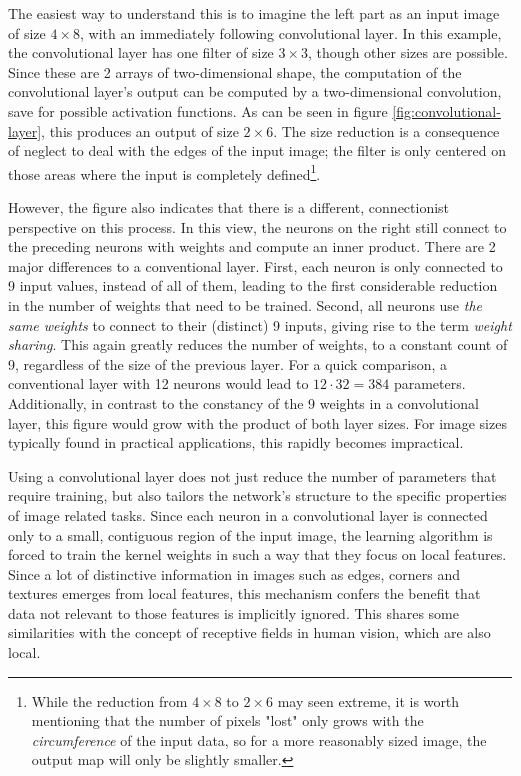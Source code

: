 \documentclass[11pt, a4paper]{article}
\begin{document}
The easiest way to understand this is to imagine the left part as an input image of size $4 \times 8$, with an immediately following convolutional layer. In this example, the convolutional layer has one filter of size $3 \times 3$, though other sizes are possible. Since these are 2 arrays of two-dimensional shape, the computation of the convolutional layer's output can be computed by a two-dimensional convolution, save for possible activation functions. As can be seen in figure \ref{fig:convolutional-layer}, this produces an output of size $2 \times 6$. The size reduction is a consequence of neglect to deal with the edges of the input image; the filter is only centered on those areas where the input is completely defined\footnote{While the reduction from $4 \times 8$ to $2 \times 6$ may seen extreme, it is worth mentioning that the number of pixels "lost" only grows with the \emph{circumference} of the input data, so for a more reasonably sized image, the output map will only be slightly smaller.}.

However, the figure also indicates that there is a different, connectionist perspective on this process. In this view, the neurons on the right still connect to the preceding neurons with weights and compute an inner product. There are 2 major differences to a conventional layer. First, each neuron is only connected to 9 input values, instead of all of them, leading to the first considerable reduction in the number of weights that need to be trained. Second, all neurons use \emph{the same weights} to connect to their (distinct) 9 inputs, giving rise to the term \emph{weight sharing}. This again greatly reduces the number of weights, to a constant count of 9, regardless of the size of the previous layer. For a quick comparison, a conventional layer with 12 neurons would lead to $12 \cdot 32 = 384$ parameters. Additionally, in contrast to the constancy of the 9 weights in a convolutional layer, this figure would grow with the product of both layer sizes. For image sizes typically found in practical applications, this rapidly becomes impractical.

Using a convolutional layer does not just reduce the number of parameters that require training, but also tailors the network's structure to the specific properties of image related tasks. Since each neuron in a convolutional layer is connected only to a small, contiguous region of the input image, the learning algorithm is forced to train the kernel weights in such a way that they focus on local features. Since a lot of distinctive information in images such as edges, corners and textures emerges from local features, this mechanism confers the benefit that data not relevant to those features is implicitly ignored. This shares some similarities with the concept of receptive fields in human vision, which are also local.
\end{document}
